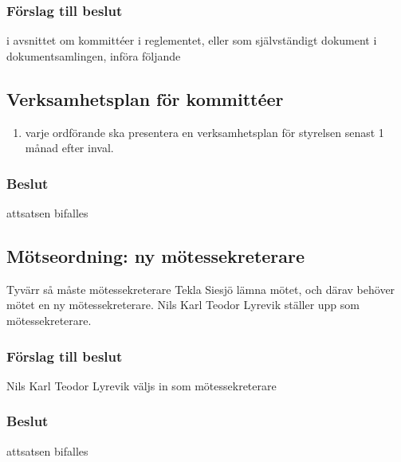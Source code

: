 \documentclass[protokoll]{dvd}
\begin{document}
\subsubsection*{Förslag till beslut}
\begin{attsatser}
    \item i avsnittet om kommittéer i reglementet, eller som självständigt dokument i dokumentsamlingen, införa följande

     \begin{displayquote}
        \subsection*{Verksamhetsplan för kommittéer}
        \begin{enumerate}[label=\arabic* §]
            \item varje ordförande ska presentera en verksamhetsplan för styrelsen senast 1 månad efter inval.
        \end{enumerate}
    \end{displayquote}
\end{attsatser}
\subsubsection*{Beslut}
\begin{attsatser}
    \item attsatsen bifalles
\end{attsatser}

\subsection{Mötseordning: ny mötessekreterare}
Tyvärr så måste mötessekreterare Tekla Siesjö lämna mötet,
och därav behöver mötet en ny mötessekreterare.
Nils Karl Teodor Lyrevik ställer upp som mötessekreterare.

\subsubsection*{Förslag till beslut}
\begin{attsatser}
	\item Nils Karl Teodor Lyrevik väljs in som mötessekreterare
\end{attsatser}
\subsubsection*{Beslut}
\begin{attsatser}
    \item attsatsen bifalles
\end{attsatser}
\end{document}
